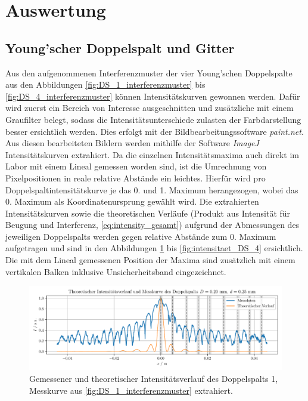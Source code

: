 \documentclass[ngerman]{scrartcl}
\begin{document}
\section{Auswertung}
\label{sec:auswertung}

\subsection{Young'scher Doppelspalt und Gitter}
\label{subsec:auswertung_doppelspalt_gitter_gitter}

Aus den aufgenommenen Interferenzmuster der vier Young'schen Doppelspalte aus den Abbildungen \ref{fig:DS_1_interferenzmuster} bis \ref{fig:DS_4_interferenzmuster} können Intensitätskurven gewonnen werden. Dafür wird zuerst ein Bereich von Interesse ausgeschnitten und zusätzliche mit einem Graufilter belegt, sodass die Intensitätsunterschiede zulasten der Farbdarstellung besser ersichtlich werden. Dies erfolgt mit der Bildbearbeitungssoftware \textit{paint.net}. Aus diesen bearbeiteten Bildern werden mithilfe der Software \textit{ImageJ} Intensitätskurven extrahiert. Da die einzelnen Intensitätsmaxima auch direkt im Labor mit einem Lineal gemessen worden sind, ist die Umrechnung von Pixelpositionen in reale relative Abstände ein leichtes. Hierfür wird pro Doppelspaltintensitätskurve je das 0. und 1. Maximum herangezogen, wobei das 0. Maximum als Koordinatenursprung gewählt wird. Die extrahierten Intensitätskurven sowie die theoretischen Verläufe (Produkt aus Intensität für Beugung und Interferenz, \autoref{eq:intensity_gesamt}) aufgrund der Abmessungen des jeweiligen Doppelspalts werden gegen relative Abstände zum 0. Maximum aufgetragen und sind in den Abbildungen \ref{fig:intensitaet_DS_1} bis \ref{fig:intensitaet_DS_4} ersichtlich. Die mit dem Lineal gemessenen Position der Maxima sind zusätzlich mit einem vertikalen Balken inklusive Unsicherheitsband eingezeichnet.
%
\begin{figure}[H]
    \centering
    \begin{samepage}
        \includegraphics[width=\linewidth]{../python/plots/young_1.pdf}
        \caption[Intensitätskurve DS 1]{Gemessener und theoretischer Intensitätsverlauf des Doppelspalts 1, Messkurve aus \autoref{fig:DS_1_interferenzmuster} extrahiert.}
        \label{fig:intensitaet_DS_1}
    \end{samepage}
\end{figure}
\end{document}
